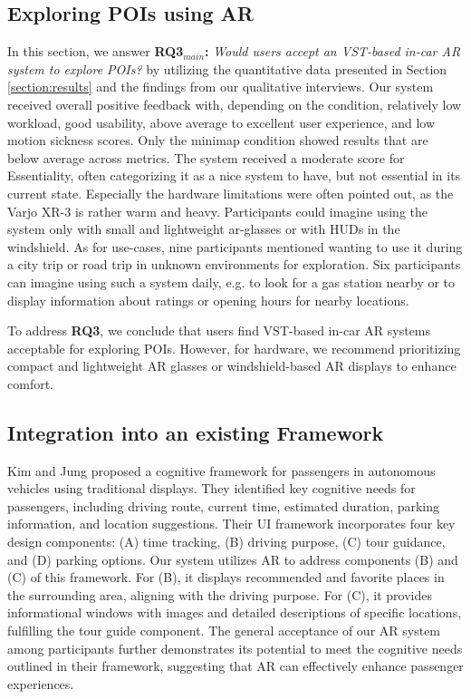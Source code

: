 \subsection{Exploring POIs using AR}
In this section, we answer \textbf{RQ3$_{main}$:} \textit{Would users accept an VST-based in-car AR system to explore POIs?} by utilizing the quantitative data presented in Section \ref{section:results} and the findings from our qualitative interviews. Our system received overall positive feedback with, depending on the condition, relatively low workload, good usability, above average to excellent user experience, and low motion sickness scores. Only the minimap condition showed results that are below average across metrics. The system received a moderate score for Essentiality, often categorizing it as a nice system to have, but not essential in its current state. Especially the hardware limitations were often pointed out, as the Varjo XR-3 is rather warm and heavy. Participants could imagine using the system only with small and lightweight ar-glasses or with HUDs in the windshield. As for use-cases, nine participants mentioned wanting to use it during a city trip or road trip in unknown environments for exploration. Six participants can imagine using such a system daily, e.g. to look for a gas station nearby or to display information about ratings or opening hours for nearby locations.

To address \textbf{RQ3}, we conclude that users find VST-based in-car AR systems acceptable for exploring POIs. However, for hardware, we recommend prioritizing compact and lightweight AR glasses or windshield-based AR displays to enhance comfort.



\subsection{Integration into an existing Framework}
Kim and Jung \cite{kim2019automotive} proposed a cognitive framework for passengers in autonomous vehicles using traditional displays. They identified key cognitive needs for passengers, including driving route, current time, estimated duration, parking information, and location suggestions. Their UI framework incorporates four key design components: (A) time tracking, (B) driving purpose, (C) tour guidance, and (D) parking options. Our system utilizes AR to address components (B) and (C) of this framework. For (B), it displays recommended and favorite places in the surrounding area, aligning with the driving purpose. For (C), it provides informational windows with images and detailed descriptions of specific locations, fulfilling the tour guide component. The general acceptance of our AR system among participants further demonstrates its potential to meet the cognitive needs outlined in their framework, suggesting that AR can effectively enhance passenger experiences.

